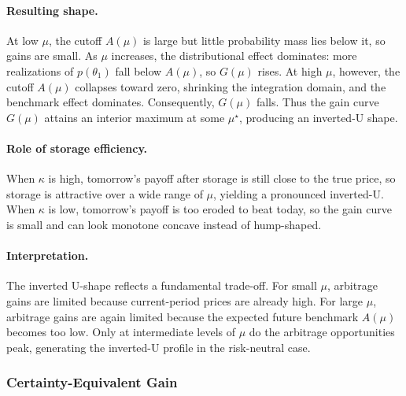 \paragraph{Resulting shape.}  
At low $\mu$, the cutoff $A(\mu)$ is large but little probability mass lies below it, so gains are small. As $\mu$ increases, the distributional effect dominates: more realizations of $p(\theta_1)$ fall below $A(\mu)$, so $G(\mu)$ rises. At high $\mu$, however, the cutoff $A(\mu)$ collapses toward zero, shrinking the integration domain, and the benchmark effect dominates. Consequently, $G(\mu)$ falls. Thus the gain curve $G(\mu)$ attains an interior maximum at some $\mu^\star$, producing an inverted-U shape.


\paragraph{Role of storage efficiency.}
When $\kappa$ is high, tomorrow’s payoff after storage is still close to the true price, so storage is attractive over a wide range of $\mu$, yielding a pronounced inverted-U. When $\kappa$ is low, tomorrow’s payoff is too eroded to beat today, so the gain curve is small and can look monotone concave instead of hump-shaped.


\paragraph{Interpretation.}  
The inverted U-shape reflects a fundamental trade-off. For small $\mu$, arbitrage gains are limited because current-period prices are already high. For large $\mu$, arbitrage gains are again limited because the expected future benchmark $A(\mu)$ becomes too low. Only at intermediate levels of $\mu$ do the arbitrage opportunities peak, generating the inverted-U profile in the risk-neutral case.


\subsubsection{Certainty-Equivalent Gain}



